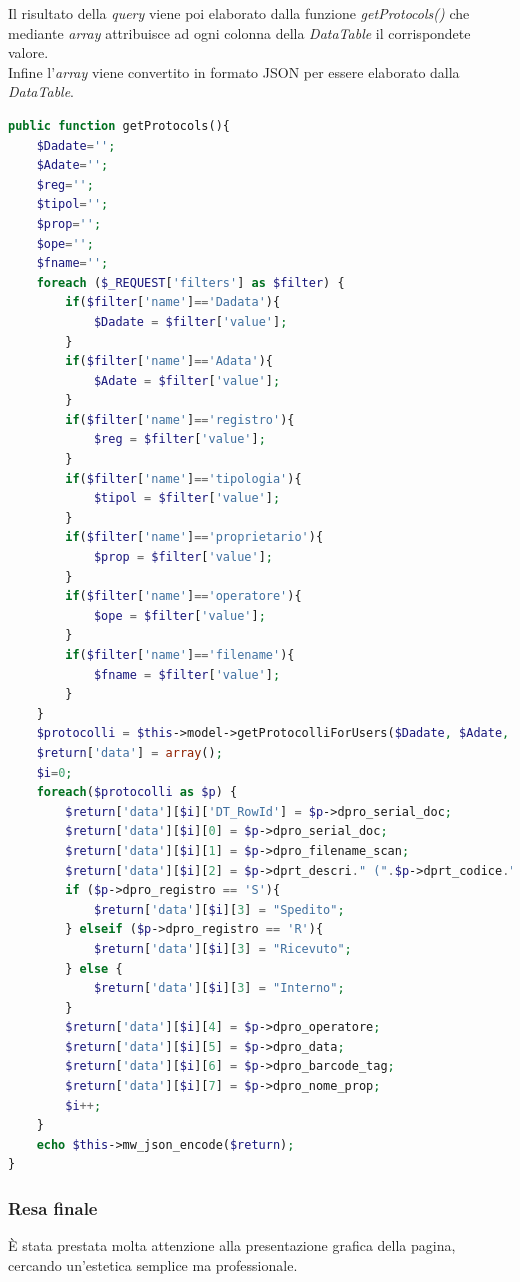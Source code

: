         
        Il risultato della \textit{query} viene poi elaborato dalla funzione \textit{getProtocols()} che mediante \textit{array} attribuisce ad ogni colonna della \textit{DataTable} il corrispondete valore. 
        \\
        Infine l'\textit{array} viene convertito in formato JSON per essere elaborato dalla \textit{DataTable}.
        \begin{lstlisting}[language=PHP, caption=Funzione getProtocols()]
public function getProtocols(){
    $Dadate='';
    $Adate='';
    $reg='';
    $tipol='';
    $prop='';
    $ope='';
    $fname='';
    foreach ($_REQUEST['filters'] as $filter) {
        if($filter['name']=='Dadata'){
            $Dadate = $filter['value'];
        }
        if($filter['name']=='Adata'){
            $Adate = $filter['value'];
        }
        if($filter['name']=='registro'){
            $reg = $filter['value'];
        }
        if($filter['name']=='tipologia'){
            $tipol = $filter['value'];
        }
        if($filter['name']=='proprietario'){
            $prop = $filter['value'];
        }
        if($filter['name']=='operatore'){
            $ope = $filter['value'];
        }
        if($filter['name']=='filename'){
            $fname = $filter['value'];
        }
    }
    $protocolli = $this->model->getProtocolliForUsers($Dadate, $Adate, $reg, $tipol, $prop, $op$fname, $_SESSION[NOME_SESSIONE]['user']);
    $return['data'] = array();
    $i=0;
    foreach($protocolli as $p) {
        $return['data'][$i]['DT_RowId'] = $p->dpro_serial_doc;
        $return['data'][$i][0] = $p->dpro_serial_doc;
        $return['data'][$i][1] = $p->dpro_filename_scan;
        $return['data'][$i][2] = $p->dprt_descri." (".$p->dprt_codice.")";
        if ($p->dpro_registro == 'S'){
            $return['data'][$i][3] = "Spedito";
        } elseif ($p->dpro_registro == 'R'){
            $return['data'][$i][3] = "Ricevuto";
        } else {
            $return['data'][$i][3] = "Interno";
        }
        $return['data'][$i][4] = $p->dpro_operatore;
        $return['data'][$i][5] = $p->dpro_data;
        $return['data'][$i][6] = $p->dpro_barcode_tag;
        $return['data'][$i][7] = $p->dpro_nome_prop;
        $i++;
    }
    echo $this->mw_json_encode($return);
}
        \end{lstlisting}
        
    \subsubsection{Resa finale}
        È stata prestata molta attenzione alla presentazione grafica della pagina, cercando un'estetica semplice ma professionale.
        
